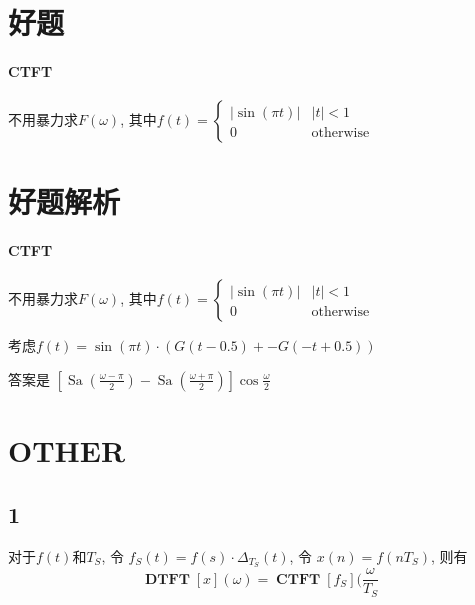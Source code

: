 \documentclass{ctexart}
\DeclareMathOperator{\CTFT}{\mathbf{CTFT}}
\DeclareMathOperator{\DTFT}{\mathbf{DTFT}}
\DeclareMathOperator{\Sa}{\mathrm{Sa}}
\begin{document}
\section{好题}
\paragraph{CTFT} 不用暴力求$F(\omega)$, 其中$f(t) = \begin{cases} |\sin(\pi t)| & |t| < 1\\ 0 & \text{otherwise} \end{cases}$


\pagebreak
\section{好题解析}
\paragraph{CTFT} 不用暴力求$F(\omega)$, 其中$f(t) = \begin{cases} |\sin(\pi t)| & |t| < 1\\ 0 & \text{otherwise} \end{cases}$\par
    考虑$f(t) = \sin(\pi t) \cdot \left( G(t-0.5) + -G(-t+0.5) \right)$\par
    答案是 $\left[\Sa\left(\frac{\omega - \pi}{2}\right) - \Sa\left(\frac{\omega + \pi}{2}\right)\right] \cos \frac{\omega}{2}$

\section{OTHER}
\subsection{1}
对于$f(t)$和$T_S$, 令 $f_S(t) = f(s) \cdot \Delta_{T_S}(t)$, 令 $ x(n) = f(nT_S)$, 则有 \[
    \DTFT[x](\omega) = \CTFT[f_S](\frac{\omega}{T_S}
    \]
\end{document}
